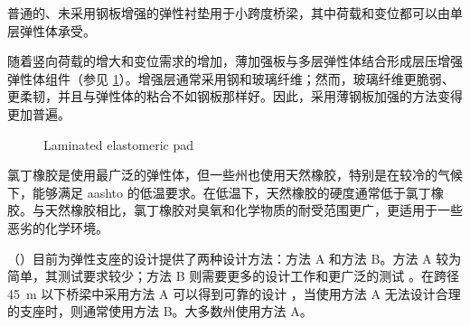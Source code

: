 普通的、未采用钢板增强的弹性衬垫用于小跨度桥梁，其中荷载和变位都可以由单层弹性体承受。

随着竖向荷载的增大和变位需求的增加，薄加强板与多层弹性体结合形成层压增强弹性体组件（参见 \cref{fig:laminated-elastomeric-pad}）。增​​强层通常采用钢和玻璃纤维；然而，玻璃纤维更脆弱、更柔韧，并且与弹性体的粘合不如钢板那样好。因此，采用薄钢板加强的方法变得更加普遍。

\begin{figure}
  \caption{Laminated elastomeric pad}\label{fig:laminated-elastomeric-pad}
\end{figure}

氯丁橡胶是使用最广泛的弹性体，但一些州也使用天然橡胶\cite{stanton2004r}，特别是在较冷的气候下，能够满足 \acrshort{aashto} 的低温要求。在低温下，天然橡胶的硬度通常低于氯丁橡胶。与天然橡胶相比，氯丁橡胶对臭氧和化学物质的耐受范围更广，更适用于一些恶劣的化学环境。

（\lrfd）目前为弹性支座的设计提供了两种设计方法：方法 A 和方法 B。方法 A 较为简单，其测试要求较少；方法 B 则需要更多的设计工作和更广泛的测试 \cite{aashto2012l}。在跨径 \qty{45}{m} 以下桥梁中采用方法 A 可以得到可靠的设计 \cite{stanton2004r}，当使用方法 A 无法设计合理的支座时，则通常使用方法 B。大多数州使用方法 A。\cite{stanton2004r}

